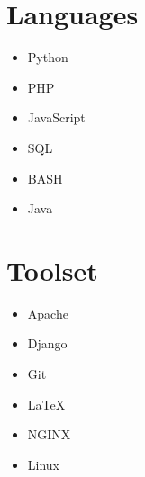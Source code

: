 \documentclass{article}
\begin{document}
\begin{minipage}[t]{.2\textwidth}
\section*{Languages}
\vspace{0.8em}
\begin{itemize}
	\item Python
	\item PHP
	\item JavaScript
	\item SQL
	\item BASH
	\item Java
\end{itemize}
\section*{Toolset}
\vspace{0.8em}
\begin{itemize}
	\item Apache
	\item Django
	\item Git
	\item \LaTeX
	\item NGINX
	\item Linux
\end{itemize}
\end{minipage}
\end{document}

